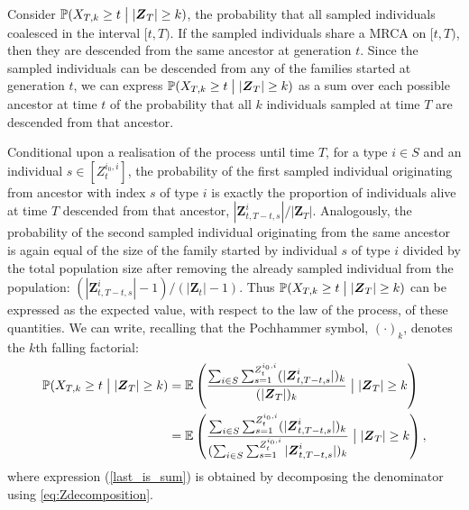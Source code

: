 \documentclass[preprint,3p,12pt]{elsarticle}
\theoremstyle{definition}
\newcommand{\Z}{\boldsymbol{Z}_{t, T-t, s}^{i}}
\newcommand{\z}[1][i_0, i]{Z_t^{#1}}
\begin{document}
Consider $\mathbb{P}(X_{T,k} \ge t \bigm| |\boldsymbol{Z}_T| \ge k)$, the probability that all sampled individuals coalesced in the interval $[t, T)$. If the sampled individuals share a MRCA on $[t, T)$, then they are descended from the same ancestor at generation $t$. 
Since the sampled individuals can be descended from any of the families started at generation $t$, we can express $\mathbb{P}(X_{T,k} \ge t \bigm| |\boldsymbol{Z}_T| \ge k)$ as a sum over each possible ancestor  at time $t$ of the probability that all $k$ individuals sampled at time $T$ are descended from that ancestor.

Conditional upon a realisation of the process until time $T$, for a type $i \in S$ and an individual $s \in [\z]$, the probability of the first sampled individual originating from ancestor with index $s$ of type $i$ is exactly the proportion of individuals alive at time $T$ descended from that ancestor,
    ${|\Z|}/{|\boldsymbol{Z}_T|}$. 
Analogously, the probability of the second sampled individual originating from the same ancestor is again equal of the size of the family started by individual $s$ of type $i$ divided by the total population size after removing the already sampled individual from the population:
$({|\Z|-1})/{(|\boldsymbol{Z}_t|-1)}$.
Thus $\mathbb{P}(X_{T,k} \ge t \bigm| |\boldsymbol{Z}_T| \ge k)$ can be expressed as the expected value, with respect to the law of the process, of these quantities. 
We can write, recalling that the Pochhammer symbol, $(\cdot)_k$, denotes the $k$th falling factorial:
\begin{align}
\mathbb{P}(X_{T,k} \ge t \bigm| |\boldsymbol{Z}_T| \ge k) %
    &=\mathbb{E}\left(\frac{\sum_{i \in S}\sum_{s=1}^{\z} (|\Z|)_k }
    {(|\boldsymbol{Z}_T|)_k} \bigm| |\boldsymbol{Z}_T| \ge k\right) \nonumber \\
    &=\mathbb{E}\left(\frac{\sum_{i \in S}\sum_{s=1}^{\z}  (|\Z|)_k}
    {(\sum_{i \in S} \sum_{s=1}^{\z} |\Z|)_k }\bigm| |\boldsymbol{Z}_T| \ge k\right), \label{last_is_sum}
\end{align}
where expression (\ref{last_is_sum}) is obtained by decomposing the denominator using \eqref{eq:Zdecomposition}. 
\end{document}
